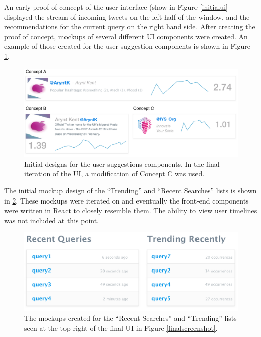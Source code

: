 \documentclass{l4proj}
\begin{document}
        An early proof of concept of the user interface (show in Figure \ref{initialui} displayed the stream of incoming tweets on the left half of the window, and the recommendations for the current query on the right hand side. After creating the proof of concept, mockups of several different UI components were created. An example of those created for the user suggestion components is shown in Figure \ref{suggestionsmockups}.
        
\begin{figure}[H]
\centering
\includegraphics[scale=0.5]{suggestionsmockups.pdf}
\caption{Initial designs for the user suggestions components. In the final iteration of the UI, a modification of Concept C was used.}
\label{suggestionsmockups}
\end{figure}
        
        The initial mockup design of the ``Trending'' and ``Recent Searches'' lists is shown in \ref{listmockups}. These mockups were iterated on and eventually the front-end components were written in React to closely resemble them. The ability to view user timelines was not included at this point.
        
\begin{figure}[H]
\centering
\includegraphics[scale=0.5]{listmockups.pdf}
\caption{The mockups created for the ``Recent Searches'' and ``Trending'' lists seen at the top right of the final UI in Figure \ref{finalscreenshot}.}
\label{listmockups}
\end{figure}    
\end{document}
